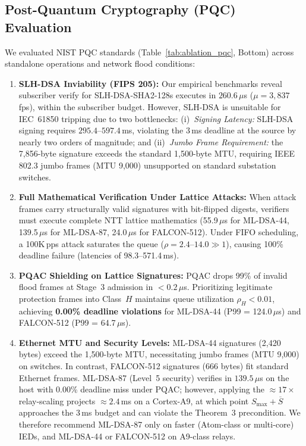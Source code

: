 \documentclass[journal]{IEEEtran}
\begin{document}
\subsection{Post-Quantum Cryptography (PQC) Evaluation}
We evaluated NIST PQC standards (Table~\ref{tab:ablation_pqc}, Bottom) across standalone operations and network flood conditions:
\begin{enumerate}[leftmargin=*,noitemsep,topsep=1pt]
    \item \textbf{SLH-DSA Inviability (FIPS 205):} Our empirical benchmarks reveal subscriber verify for SLH-DSA-SHA2-128s executes in $260.6\,\mu$s ($\mu = 3{,}837$\,fps), within the subscriber budget. However, SLH-DSA is unsuitable for IEC~61850 tripping due to two bottlenecks: (i)~\emph{Signing Latency:} SLH-DSA signing requires $295.4\text{--}597.4$\,ms, violating the 3\,ms deadline at the source by nearly two orders of magnitude; and (ii)~\emph{Jumbo Frame Requirement:} the 7,856-byte signature exceeds the standard 1,500-byte MTU, requiring IEEE 802.3 jumbo frames (MTU 9,000) unsupported on standard substation switches.
    \item \textbf{Full Mathematical Verification Under Lattice Attacks:} When attack frames carry structurally valid signatures with bit-flipped digests, verifiers must execute complete NTT lattice mathematics (55.9\,$\mu$s for ML-DSA-44, 139.5\,$\mu$s for ML-DSA-87, 24.0\,$\mu$s for FALCON-512). Under FIFO scheduling, a 100K\,pps attack saturates the queue ($\rho = 2.4\text{--}14.0 \gg 1$), causing 100\% deadline failure (latencies of 98.3--571.4\,ms). 
    \item \textbf{PQAC Shielding on Lattice Signatures:} PQAC drops 99\% of invalid flood frames at Stage~3 admission in $<0.2\,\mu$s. Prioritizing legitimate protection frames into Class~$H$ maintains queue utilization $\rho_H < 0.01$, achieving \textbf{0.00\% deadline violations} for ML-DSA-44 (P99 = 124.0\,$\mu$s) and FALCON-512 (P99 = 64.7\,$\mu$s).
    \item \textbf{Ethernet MTU and Security Levels:} ML-DSA-44 signatures (2,420 bytes) exceed the 1,500-byte MTU, necessitating jumbo frames (MTU 9,000) on switches. In contrast, FALCON-512 signatures (666 bytes) fit standard Ethernet frames. ML-DSA-87 (Level~5 security) verifies in $139.5\,\mu$s on the host with 0.00\% deadline miss under PQAC; however, applying the $\approx 17\times$ relay-scaling projects $\approx 2.4$\,ms on a Cortex-A9, at which point $S_{\max}+\overline{S}$ approaches the 3\,ms budget and can violate the Theorem~3 precondition. We therefore recommend ML-DSA-87 only on faster (Atom-class or multi-core) IEDs, and ML-DSA-44 or FALCON-512 on A9-class relays.
\end{enumerate}
\end{document}
